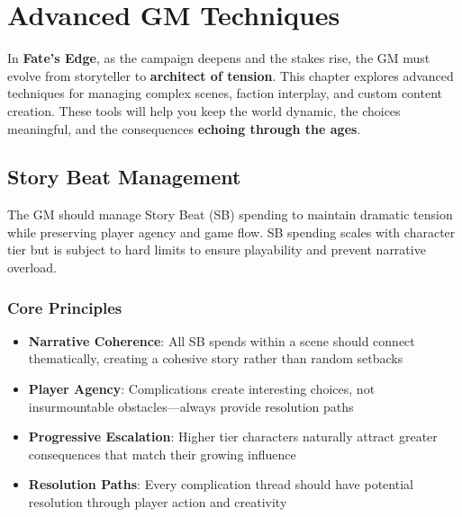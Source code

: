 \chapter{Advanced GM Techniques}

In \textbf{Fate's Edge}, as the campaign deepens and the stakes rise, the GM must evolve from storyteller to \textbf{architect of tension}. This chapter explores advanced techniques for managing complex scenes, faction interplay, and custom content creation. These tools will help you keep the world dynamic, the choices meaningful, and the consequences \textbf{echoing through the ages}.

\section*{Story Beat Management}

The GM should manage Story Beat (SB) spending to maintain dramatic tension while preserving player agency and game flow. SB spending scales with character tier but is subject to hard limits to ensure playability and prevent narrative overload.

\subsection*{Core Principles}
\begin{itemize}
    \item \textbf{Narrative Coherence}: All SB spends within a scene should connect thematically, creating a cohesive story rather than random setbacks
    \item \textbf{Player Agency}: Complications create interesting choices, not insurmountable obstacles—always provide resolution paths
    \item \textbf{Progressive Escalation}: Higher tier characters naturally attract greater consequences that match their growing influence
    \item \textbf{Resolution Paths}: Every complication thread should have potential resolution through player action and creativity
\end{itemize}

